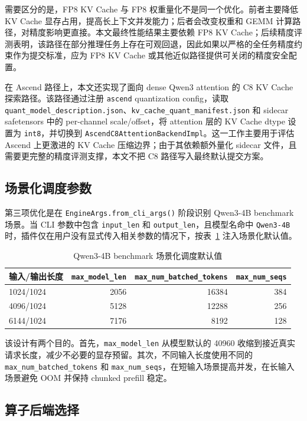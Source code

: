 \documentclass[UTF8,10.5pt]{ctexart}
\newcommand{\code}[1]{\texttt{#1}}
\begin{document}
需要区分的是，FP8 KV Cache 与 FP8 权重量化不是同一个优化。前者主要降低 KV Cache 显存占用，提高长上下文并发能力；后者会改变权重和 GEMM 计算路径，对精度影响更直接。本文最终性能结果主要依赖 FP8 KV Cache；后续精度评测表明，该路径在部分推理任务上存在可观回退，因此如果以严格的全任务精度约束作为提交标准，应为 FP8 KV Cache 或其他近似路径提供可关闭的精度安全配置。

在 Ascend 路径上，本文还实现了面向 dense Qwen3 attention 的 C8 KV Cache 探索路径。该路径通过注册 \code{ascend} quantization config，读取 \code{quant\_model\_description.json}、\code{kv\_cache\_quant\_manifest.json} 和 sidecar safetensors 中的 per-channel scale/offset，将 attention 层的 KV Cache dtype 设置为 \code{int8}，并切换到 \code{AscendC8AttentionBackendImpl}。这一工作主要用于评估 Ascend 上更激进的 KV Cache 压缩边界；由于其依赖额外量化 sidecar 文件，且需要更完整的精度评测支撑，本文不把 C8 路径写入最终默认提交方案。

\subsection{场景化调度参数}

第三项优化是在 \code{EngineArgs.from\_cli\_args()} 阶段识别 Qwen3-4B benchmark 场景。当 CLI 参数中包含 \code{input\_len} 和 \code{output\_len}，且模型名命中 \code{Qwen3-4B} 时，插件仅在用户没有显式传入相关参数的情况下，按表~\ref{tab:scheduler-defaults} 注入场景化默认值。

\begin{table}[H]
\centering
\caption{Qwen3-4B benchmark 场景化调度默认值}
\label{tab:scheduler-defaults}
\begin{tabular}{lrrr}
\toprule
输入/输出长度 & \code{max\_model\_len} & \code{max\_num\_batched\_tokens} & \code{max\_num\_seqs} \\
\midrule
1024/1024 & 2056 & 16384 & 384 \\
4096/1024 & 5128 & 12288 & 256 \\
6144/1024 & 7176 & 8192 & 128 \\
\bottomrule
\end{tabular}
\end{table}

该设计有两个目的。首先，\code{max\_model\_len} 从模型默认的 40960 收缩到接近真实请求长度，减少不必要的显存预留。其次，不同输入长度使用不同的 \code{max\_num\_batched\_tokens} 和 \code{max\_num\_seqs}，在短输入场景提高并发，在长输入场景避免 OOM 并保持 chunked prefill 稳定。

\subsection{算子后端选择}
\end{document}
